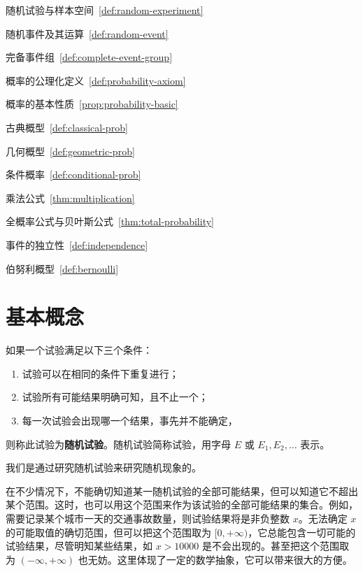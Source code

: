 ﻿\documentclass[lang=cn,11pt]{elegantbook}
\begin{document}
\begin{introduction}
  \item 随机试验与样本空间~\ref{def:random-experiment}
  \item 随机事件及其运算~\ref{def:random-event}
  \item 完备事件组~\ref{def:complete-event-group}
  \item 概率的公理化定义~\ref{def:probability-axiom}
  \item 概率的基本性质~\ref{prop:probability-basic}
  \item 古典概型~\ref{def:classical-prob}
  \item 几何概型~\ref{def:geometric-prob}
  \item 条件概率~\ref{def:conditional-prob}
  \item 乘法公式~\ref{thm:multiplication}
  \item 全概率公式与贝叶斯公式~\ref{thm:total-probability}
  \item 事件的独立性~\ref{def:independence}
  \item 伯努利概型~\ref{def:bernoulli}
\end{introduction}

\section{基本概念}

\begin{definition}[随机试验] \label{def:random-experiment}
如果一个试验满足以下三个条件：
\begin{enumerate}
    \item 试验可以在相同的条件下重复进行；
    \item 试验所有可能结果明确可知，且不止一个；
    \item 每一次试验会出现哪一个结果，事先并不能确定，
\end{enumerate}
则称此试验为\textbf{随机试验}。随机试验简称试验，用字母 \(E\) 或 \(E_1, E_2, \dots\) 表示。
\end{definition}

我们是通过研究随机试验来研究随机现象的。

\begin{note}
在不少情况下，不能确切知道某一随机试验的全部可能结果，但可以知道它不超出某个范围。这时，也可以用这个范围来作为该试验的全部可能结果的集合。例如，需要记录某个城市一天的交通事故数量，则试验结果将是非负整数 \(x\)。无法确定 \(x\) 的可能取值的确切范围，但可以把这个范围取为 \([0, +\infty)\)，它总能包含一切可能的试验结果，尽管明知某些结果，如 \(x > 10000\) 是不会出现的。甚至把这个范围取为 \((-\infty, +\infty)\) 也无妨。这里体现了一定的数学抽象，它可以带来很大的方便。
\end{note}
\end{document}
